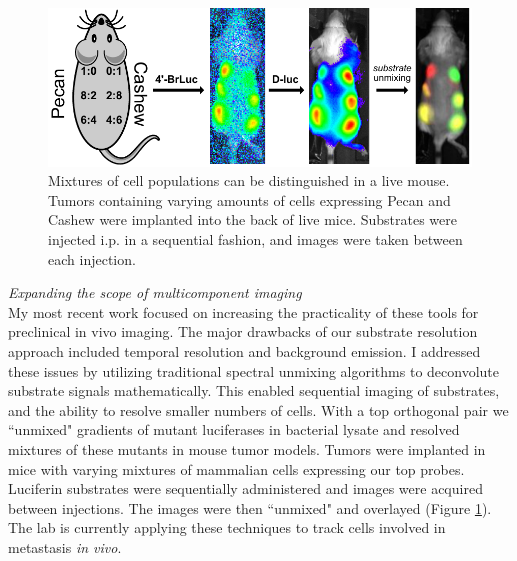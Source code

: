 \documentclass{F32}
\begin{document}
\begin{figure}
\begin{centering}
\includegraphics[width=\textwidth]{Previous_Research_figs/mouse_unmixing.pdf}

\end{centering}
\footnotesize
\caption{\label{figure:mouse_unmixing}
Mixtures of cell populations can be distinguished in a live mouse. Tumors containing varying amounts of cells expressing Pecan and Cashew were implanted into the back of live mice. Substrates were injected i.p. in a sequential fashion, and images were taken between each injection.
}
\end{figure}

\textit{Expanding the scope of multicomponent imaging}\\
My most recent work focused on increasing the practicality of these tools for preclinical in vivo imaging. The major drawbacks of our substrate resolution approach included temporal resolution and background emission. I addressed these issues by utilizing traditional spectral unmixing algorithms to deconvolute substrate signals mathematically. This enabled sequential imaging of substrates, and the ability to resolve smaller numbers of cells. With a top orthogonal pair we ``unmixed" gradients of mutant luciferases in bacterial lysate and resolved mixtures of these mutants in mouse tumor models. Tumors were implanted in mice with varying mixtures of mammalian cells expressing our top probes. Luciferin substrates were sequentially administered and images were acquired between injections. The images were then ``unmixed" and overlayed (Figure \ref{figure:mouse_unmixing}). The lab is currently applying these techniques to track cells involved in metastasis \textit{in vivo}.
\end{document}
